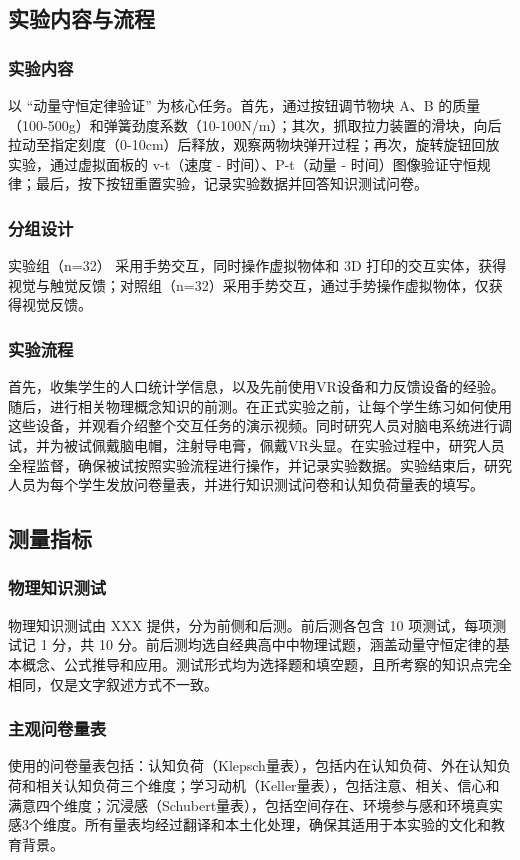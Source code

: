 \documentclass[runningheads]{llncs}
\begin{document}
\subsection{实验内容与流程}
\subsubsection{实验内容}
以 “动量守恒定律验证” 为核心任务。首先，通过按钮调节物块 A、B 的质量（100-500g）和弹簧劲度系数（10-100N/m）；其次，抓取拉力装置的滑块，向后拉动至指定刻度（0-10cm）后释放，观察两物块弹开过程；再次，旋转旋钮回放实验，通过虚拟面板的 v-t（速度 - 时间）、P-t（动量 - 时间）图像验证守恒规律；最后，按下按钮重置实验，记录实验数据并回答知识测试问卷。

\subsubsection{分组设计} 实验组（n=32） 采用手势交互，同时操作虚拟物体和 3D 打印的交互实体，获得视觉与触觉反馈；对照组（n=32）采用手势交互，通过手势操作虚拟物体，仅获得视觉反馈。

\subsubsection{实验流程}
首先，收集学生的人口统计学信息，以及先前使用VR设备和力反馈设备的经验。随后，进行相关物理概念知识的前测。在正式实验之前，让每个学生练习如何使用这些设备，并观看介绍整个交互任务的演示视频。同时研究人员对脑电系统进行调试，并为被试佩戴脑电帽，注射导电膏，佩戴VR头显。在实验过程中，研究人员全程监督，确保被试按照实验流程进行操作，并记录实验数据。实验结束后，研究人员为每个学生发放问卷量表，并进行知识测试问卷和认知负荷量表的填写。

\subsection{测量指标}
\subsubsection{物理知识测试}
物理知识测试由 XXX 
提供，分为前侧和后测。前后测各包含 10 项测试，每项测试记 1 分，共 10 分。前后测均选自经典高中中物理试题，涵盖动量守恒定律的基本概念、公式推导和应用。测试形式均为选择题和填空题，且所考察的知识点完全相同，仅是文字叙述方式不一致。

\subsubsection{主观问卷量表}
使用的问卷量表包括：认知负荷（Klepsch量表）\cite{klepsch2017development}，包括内在认知负荷、外在认知负荷和相关认知负荷三个维度；学习动机（Keller量表）\cite{keller1983motivational}，包括注意、相关、信心和满意四个维度；沉浸感（Schubert量表）\cite{schubert2001experience}，包括空间存在、环境参与感和环境真实感3个维度。所有量表均经过翻译和本土化处理，确保其适用于本实验的文化和教育背景。
\end{document}

